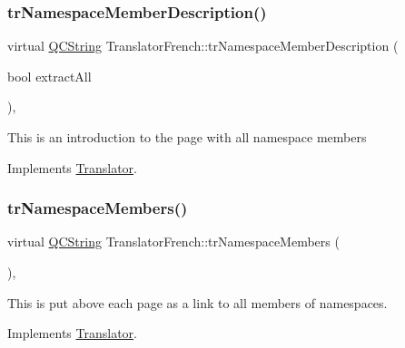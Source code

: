 \mbox{\label{class_translator_french_a519e24e453c13a4f436029e4ed73a985}} 
\subsubsection{\texorpdfstring{trNamespaceMemberDescription()}{trNamespaceMemberDescription()}}
{\footnotesize\ttfamily virtual \mbox{\hyperlink{class_q_c_string}{Q\+C\+String}} Translator\+French\+::tr\+Namespace\+Member\+Description (\begin{DoxyParamCaption}\item[{bool}]{extract\+All }\end{DoxyParamCaption})\hspace{0.3cm}{\ttfamily [inline]}, {\ttfamily [virtual]}}

This is an introduction to the page with all namespace members 

Implements \mbox{\hyperlink{class_translator}{Translator}}.

\mbox{\label{class_translator_french_a805c6dec60784e70c6c51b1da484b480}} 
\subsubsection{\texorpdfstring{trNamespaceMembers()}{trNamespaceMembers()}}
{\footnotesize\ttfamily virtual \mbox{\hyperlink{class_q_c_string}{Q\+C\+String}} Translator\+French\+::tr\+Namespace\+Members (\begin{DoxyParamCaption}{ }\end{DoxyParamCaption})\hspace{0.3cm}{\ttfamily [inline]}, {\ttfamily [virtual]}}

This is put above each page as a link to all members of namespaces. 

Implements \mbox{\hyperlink{class_translator}{Translator}}.

\mbox{\label{class_translator_french_a90d49bae46efd0dc85bce2ccd546b013}} 
